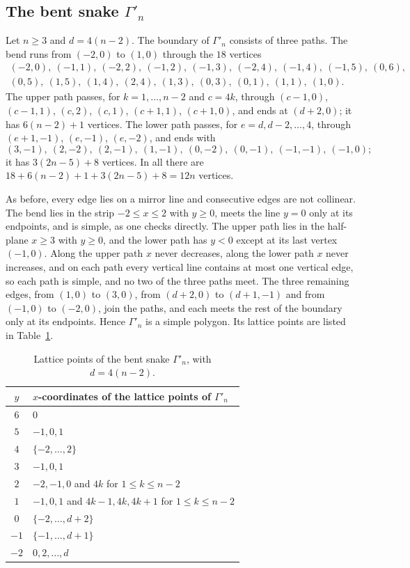 \documentclass[11pt,a4paper]{article}
\theoremstyle{plain}
\theoremstyle{definition}
\theoremstyle{remark}
\numberwithin{equation}{section}
\begin{document}
\subsection{The bent snake \texorpdfstring{$\Gamma'_n$}{Gamma' n}}
Let $n\ge3$ and $d=4(n-2)$. The boundary of $\Gamma'_n$ consists of three paths. The bend runs from $(-2,0)$ to $(1,0)$ through the $18$ vertices
\[
\begin{gathered}
(-2,0),\ (-1,1),\ (-2,2),\ (-1,2),\ (-1,3),\ (-2,4),\ (-1,4),\ (-1,5),\ (0,6),\\
(0,5),\ (1,5),\ (1,4),\ (2,4),\ (1,3),\ (0,3),\ (0,1),\ (1,1),\ (1,0).
\end{gathered}
\]
The upper path passes, for $k=1,\dots,n-2$ and $c=4k$, through $(c-1,0)$, $(c-1,1)$, $(c,2)$, $(c,1)$, $(c+1,1)$, $(c+1,0)$, and ends at $(d+2,0)$; it has $6(n-2)+1$ vertices. The lower path passes, for $e=d,d-2,\dots,4$, through $(e+1,-1)$, $(e,-1)$, $(e,-2)$, and ends with
\[
(3,-1),\ (2,-2),\ (2,-1),\ (1,-1),\ (0,-2),\ (0,-1),\ (-1,-1),\ (-1,0);
\]
it has $3(2n-5)+8$ vertices. In all there are $18+6(n-2)+1+3(2n-5)+8=12n$ vertices.

As before, every edge lies on a mirror line and consecutive edges are not collinear. The bend lies in the strip $-2\le x\le2$ with $y\ge0$, meets the line $y=0$ only at its endpoints, and is simple, as one checks directly. The upper path lies in the half-plane $x\ge3$ with $y\ge0$, and the lower path has $y<0$ except at its last vertex $(-1,0)$. Along the upper path $x$ never decreases, along the lower path $x$ never increases, and on each path every vertical line contains at most one vertical edge, so each path is simple, and no two of the three paths meet. The three remaining edges, from $(1,0)$ to $(3,0)$, from $(d+2,0)$ to $(d+1,-1)$ and from $(-1,0)$ to $(-2,0)$, join the paths, and each meets the rest of the boundary only at its endpoints. Hence $\Gamma'_n$ is a simple polygon. Its lattice points are listed in Table~\ref{tab:bentrows}.

\begin{table}[htbp]
\centering\small
\begin{tabular}{@{}cl@{}}
\toprule
$y$ & $x$-coordinates of the lattice points of $\Gamma'_n$\\
\midrule
$6$ & $0$\\
$5$ & $-1,0,1$\\
$4$ & $\{-2,\dots,2\}$\\
$3$ & $-1,0,1$\\
$2$ & $-2,-1,0$ and $4k$ for $1\le k\le n-2$\\
$1$ & $-1,0,1$ and $4k-1,4k,4k+1$ for $1\le k\le n-2$\\
$0$ & $\{-2,\dots,d+2\}$\\
$-1$ & $\{-1,\dots,d+1\}$\\
$-2$ & $0,2,\dots,d$\\
\bottomrule
\end{tabular}
\caption{Lattice points of the bent snake $\Gamma'_n$, with $d=4(n-2)$.}
\label{tab:bentrows}
\end{table}
\end{document}
